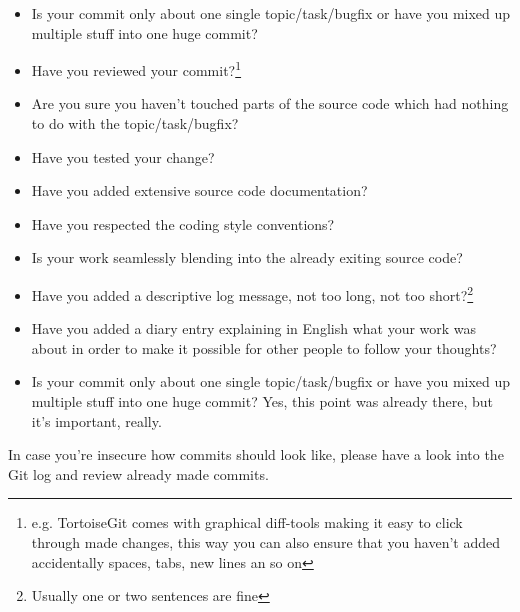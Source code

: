 \begin{itemize}
\item Is your commit only about one single topic/task/bugfix or have you mixed up multiple stuff into one huge commit?
\item Have you reviewed your commit?\footnote{e.g. TortoiseGit comes with graphical diff-tools making it easy to click through made changes, this way you can also ensure that you haven't added accidentally spaces, tabs, new lines an so on}
\item Are you sure you haven't touched parts of the source code which had nothing to do with the topic/task/bugfix?
\item Have you tested your change?
\item Have you added extensive source code documentation?
\item Have you respected the coding style conventions?
\item Is your work seamlessly blending into the already exiting source code?
\item Have you added a descriptive log message, not too long, not too short?\footnote{Usually one or two sentences are fine}
\item Have you added a diary entry explaining in English what your work was about in order to make it possible for other people to follow your thoughts?
\item Is your commit only about one single topic/task/bugfix or have you mixed up multiple stuff into one huge commit? Yes, this point was already there, but it's important, really.
\end{itemize}

In case you're insecure how commits should look like, please have a look into the Git log and review already made commits.

